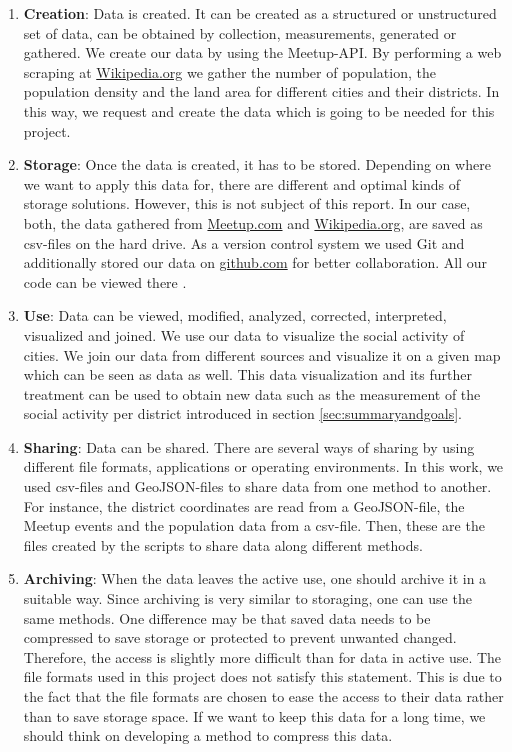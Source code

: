 \begin{enumerate}
	\item \textbf{Creation}: Data is created. It can be created as a structured or unstructured set of data, can be obtained by collection, measurements, generated or gathered. We create our data by using the Meetup-API. By performing a web scraping at \url{Wikipedia.org} we gather the number of population, the population density and the land area for different cities and their districts. In this way, we request and create the data which is going to be needed for this project.
	\item \textbf{Storage}: Once the data is created, it has to be stored. Depending on where we want to apply this data for, there are different and optimal kinds of storage solutions. However, this is not subject of this report. In our case, both, the data gathered from \url{Meetup.com} and \url{Wikipedia.org}, are saved as csv-files on the hard drive. As a version control system we used Git and additionally stored our data on \url{github.com} for better collaboration. All our code can be viewed there \cite{uabri}.
	\item \textbf{Use}: Data can be viewed, modified, analyzed, corrected, interpreted, visualized and joined. We use our data to visualize the social activity of cities. We join our data from different sources and visualize it on a given map which can be seen as data as well. This data visualization and its further treatment can be used to obtain new data such as the measurement of the social activity per district introduced in section \ref{sec:summaryandgoals}.
	\item \textbf{Sharing}: Data can be shared. There are several ways of sharing by using different file formats, applications or operating environments. In this work, we used csv-files and GeoJSON-files to share data from one method to another. For instance, the district coordinates are read from a GeoJSON-file, the Meetup events and the population data from a csv-file. Then, these are the files created by the scripts to share data along different methods.
	\item \textbf{Archiving}: When the data leaves the active use, one should archive it in a suitable way. Since archiving is very similar to storaging, one can use the same methods. One difference may be that saved data needs to be compressed to save storage or protected to prevent unwanted changed. Therefore, the access is slightly more difficult than for data in active use. The file formats used in this project does not satisfy this statement. This is due to the fact that the file formats are chosen to ease the access to their data rather than to save storage space. If we want to keep this data for a long time, we should think on developing a method to compress this data.

\end{enumerate}

